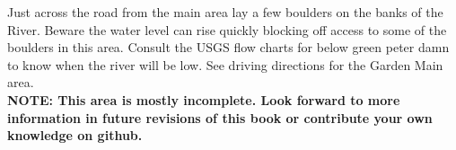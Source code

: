 







\raggedcolumns
\begin{multicols}{2}

\end{multicols}
\begin{multicols}{2}
Just across the road from the main area lay a few boulders on the banks of the River. Beware the water level can rise quickly blocking off access to some of the boulders in this area. Consult the USGS flow charts for below green peter damn to know when the river will be low. See driving directions for the Garden Main area.\\

\textbf{NOTE: This area is mostly incomplete. Look forward to more information in future revisions of this book or contribute your own knowledge on github.}\\


\newpage
	
	
	
	
	

\end{multicols}
\clearpage